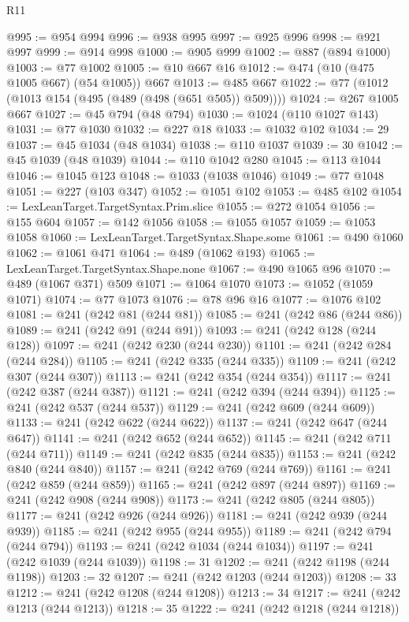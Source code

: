 \begin{lexlean}{R11}
\begin{coremodule}
@995 := @954 @994
@996 := @938 @995
@997 := @925 @996
@998 := @921 @997
@999 := @914 @998
@1000 := @905 @999
@1002 := @887 (@894 @1000)
@1003 := @77 @1002
@1005 := @10 @667 @16
@1012 := @474 (@10 (@475 @1005 @667) (@54 @1005)) @667
@1013 := @485 @667
@1022 := @77 (@1012 (@1013 @154 (@495 (@489 (@498 (@651 @505)) @509))))
@1024 := @267 @1005 @667
@1027 := @45 @794 (@48 @794)
@1030 := @1024 (@110 @1027 @143)
@1031 := @77 @1030
@1032 := @227 @18
@1033 := @1032 @102
@1034 := 29
@1037 := @45 @1034 (@48 @1034)
@1038 := @110 @1037
@1039 := 30
@1042 := @45 @1039 (@48 @1039)
@1044 := @110 @1042 @280
@1045 := @113 @1044
@1046 := @1045 @123
@1048 := @1033 (@1038 @1046)
@1049 := @77 @1048
@1051 := @227 (@103 @347)
@1052 := @1051 @102
@1053 := @485 @102
@1054 := LexLeanTarget.TargetSyntax.Prim.slice
@1055 := @272 @1054
@1056 := @155 @604
@1057 := @142 @1056
@1058 := @1055 @1057
@1059 := @1053 @1058
@1060 := LexLeanTarget.TargetSyntax.Shape.some
@1061 := @490 @1060
@1062 := @1061 @471
@1064 := @489 (@1062 @193)
@1065 := LexLeanTarget.TargetSyntax.Shape.none
@1067 := @490 @1065 @96
@1070 := @489 (@1067 @371) @509
@1071 := @1064 @1070
@1073 := @1052 (@1059 @1071)
@1074 := @77 @1073
@1076 := @78 @96 @16
@1077 := @1076 @102
@1081 := @241 (@242 @81 (@244 @81))
@1085 := @241 (@242 @86 (@244 @86))
@1089 := @241 (@242 @91 (@244 @91))
@1093 := @241 (@242 @128 (@244 @128))
@1097 := @241 (@242 @230 (@244 @230))
@1101 := @241 (@242 @284 (@244 @284))
@1105 := @241 (@242 @335 (@244 @335))
@1109 := @241 (@242 @307 (@244 @307))
@1113 := @241 (@242 @354 (@244 @354))
@1117 := @241 (@242 @387 (@244 @387))
@1121 := @241 (@242 @394 (@244 @394))
@1125 := @241 (@242 @537 (@244 @537))
@1129 := @241 (@242 @609 (@244 @609))
@1133 := @241 (@242 @622 (@244 @622))
@1137 := @241 (@242 @647 (@244 @647))
@1141 := @241 (@242 @652 (@244 @652))
@1145 := @241 (@242 @711 (@244 @711))
@1149 := @241 (@242 @835 (@244 @835))
@1153 := @241 (@242 @840 (@244 @840))
@1157 := @241 (@242 @769 (@244 @769))
@1161 := @241 (@242 @859 (@244 @859))
@1165 := @241 (@242 @897 (@244 @897))
@1169 := @241 (@242 @908 (@244 @908))
@1173 := @241 (@242 @805 (@244 @805))
@1177 := @241 (@242 @926 (@244 @926))
@1181 := @241 (@242 @939 (@244 @939))
@1185 := @241 (@242 @955 (@244 @955))
@1189 := @241 (@242 @794 (@244 @794))
@1193 := @241 (@242 @1034 (@244 @1034))
@1197 := @241 (@242 @1039 (@244 @1039))
@1198 := 31
@1202 := @241 (@242 @1198 (@244 @1198))
@1203 := 32
@1207 := @241 (@242 @1203 (@244 @1203))
@1208 := 33
@1212 := @241 (@242 @1208 (@244 @1208))
@1213 := 34
@1217 := @241 (@242 @1213 (@244 @1213))
@1218 := 35
@1222 := @241 (@242 @1218 (@244 @1218))

\end{coremodule}
\end{lexlean}
